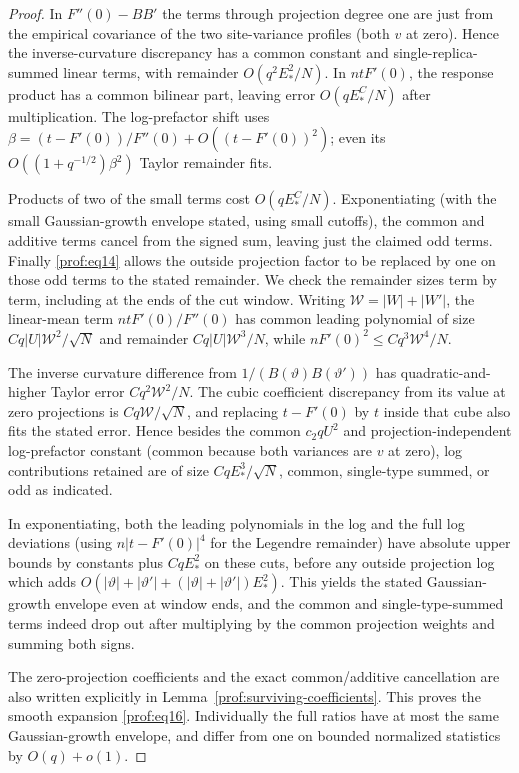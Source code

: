 \begin{proof}
In \(F''(0)-B B'\) the terms through projection degree one are just from the empirical covariance of the two site-variance profiles (both \(v\) at zero). Hence the inverse-curvature discrepancy has a common constant and single-replica-summed linear terms, with remainder \(O(q^2 E_*^2/N)\). In \(ntF'(0)\), the response product has a common bilinear part, leaving error \(O(q E_*^C/N)\) after multiplication. The log-prefactor shift uses \(\beta=(t-F'(0))/F''(0)+O((t-F'(0))^2)\); even its \(O((1+q^{-1/2})\beta^2)\) Taylor remainder fits.

Products of two of the small terms cost \(O(q E_*^C/N)\). Exponentiating (with the small Gaussian-growth envelope stated, using small cutoffs), the common and additive terms cancel from the signed sum, leaving just the claimed odd terms. Finally \eqref{prof:eq14} allows the outside projection factor to be replaced by one on those odd terms to the stated remainder. We check the remainder sizes term by term, including at the ends of
the cut window. Writing \(\mathcal W=|W|+|W'|\), the linear-mean term \(ntF'(0)/F''(0)\) has common leading polynomial of size \(C q |U|\mathcal W^2/\sqrt N\) and remainder \(C q |U|\mathcal W^3/N\), while \(nF'(0)^2\le C q^3\mathcal W^4/N\).

The inverse curvature difference from \(1/(B(\vartheta)B(\vartheta'))\) has quadratic-and-higher Taylor error \(C q^2\mathcal W^2/N\). The cubic coefficient discrepancy from its value at zero projections is \(Cq\mathcal W/\sqrt N\), and replacing \(t-F'(0)\) by \(t\) inside that cube also fits the stated error. Hence besides the common \(c_2 q U^2\) and projection-independent log-prefactor constant (common because both variances are \(v\) at zero), log contributions retained are of size \(C q E_*^3/\sqrt N\), common, single-type summed, or odd as indicated.

In exponentiating, both the leading polynomials in the log and the full log deviations (using \(n|t-F'(0)|^4\) for the Legendre remainder) have absolute upper bounds by constants plus \(Cq E_*^2\) on these cuts, before any outside projection log which adds \(O(|\vartheta|+|\vartheta'|+(|\vartheta|+|\vartheta'|)E_*^2)\). This yields the stated Gaussian-growth envelope even at window ends, and the common and single-type-summed terms indeed drop out after multiplying by the common projection weights and summing both signs.

The zero-projection coefficients and the exact common/additive
cancellation are also written explicitly in
Lemma~\ref{prof:surviving-coefficients}. This proves the smooth expansion
\eqref{prof:eq16}. Individually the full ratios have at most the same Gaussian-growth envelope, and differ from one on bounded normalized statistics by \(O(q)+o(1)\).


\end{proof}
